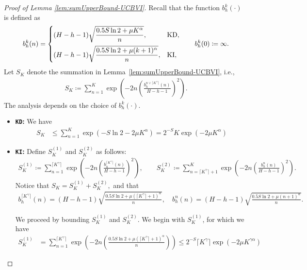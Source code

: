 \documentclass[10pt,a4paper]{amsart}
\newcommand{\KD} {\texttt{KD}}
\newcommand{\KI} {\texttt{KI}}
\begin{document}
\begin{proof}[Proof of Lemma \ref{lem:sumUpperBound-UCBVI}]
Recall that the function $b^k_h(\cdot)$ is defined as
\[
b^k_h(n)
=
\begin{cases}
(H-h-1)\sqrt{\dfrac{0.5 S\ln 2+\mu K^\alpha}{n}}, & \text{\KD},\\[2ex]
(H-h-1)\sqrt{\dfrac{0.5 S\ln 2+\mu (k+1)^\alpha}{n}}, & \text{\KI},
\end{cases}
\qquad
b^k_h(0)\coloneqq\infty.
\]
Let $S_K$ denote the summation in Lemma~\ref{lem:sumUpperBound-UCBVI}, i.e.,
\begin{align*}
    S_K \coloneqq \sum_{n=1}^{K} \exp\left(-  2n  \left(\frac{b_h^{n \vee \lceil K^\gamma\rceil}(n)}{H-h-1} \right)^2\right).
\end{align*}
The analysis depends on the choice of $b^k_h(\cdot)$.

\begin{itemize}[leftmargin=0pt]
    \item {\bf \KD:} We have
        \begin{align*}
        S_K &\leq \sum_{n=1}^{K} \exp\left(-S\ln2-2\mu  K^{\alpha}\right) = 2^{-S} K \exp\left({- 2\mu K^{\alpha}}\right) 
        \end{align*}
    \item {\bf \KI:} Define $S^{(1)}_K$ and $S^{(2)}_K$ as follows:
    \begin{align*}
        S^{(1)}_K \coloneqq \sum_{n=1}^{\lceil K^\gamma\rceil} \exp\left(- 2n  \left(\frac{b_h^{\lceil K^\gamma\rceil}(n)}{H-h-1} \right)^2\right),
        \qquad
        S^{(2)}_K \coloneqq \sum_{n=\lceil K^\gamma\rceil + 1}^{K} \exp\left(- 2n \left(\frac{b_h^{n}(n)}{H-h-1} \right)^2\right).
    \end{align*}
    Notice that $S_K = S^{(1)}_K + S^{(2)}_K,$ and that
        \begin{align*}
            b_h^{\lceil K^\gamma\rceil}(n) = (H-h-1)\sqrt{\frac{0.5 S\ln2 + \mu(\lceil K^\gamma\rceil+1)^{\alpha}}{n}},
            \quad
            b_h^n(n) = (H-h-1)\sqrt{\frac{0.5 S\ln2 + \mu( n+1 )^{\alpha}}{n}}.
        \end{align*}
        
        We proceed by bounding $S_K^{(1)}$ and $S_K^{(2)}$. We begin with $S_K^{(1)}$, for which we have
        \begin{align*}
        S_K^{(1)}
        &= \sum_{n=1}^{\lceil K^\gamma\rceil}\exp\left(-2n \left(\frac{0.5S\ln2 + \mu(\lceil K^\gamma\rceil+1)^{\alpha}}{n}\right)\right) \leq 2^{-S}\lceil K^\gamma\rceil \exp\left(-2\mu K^{\gamma\alpha}\right) 
        \end{align*}
    \end{itemize}


\end{proof}
\end{document}
